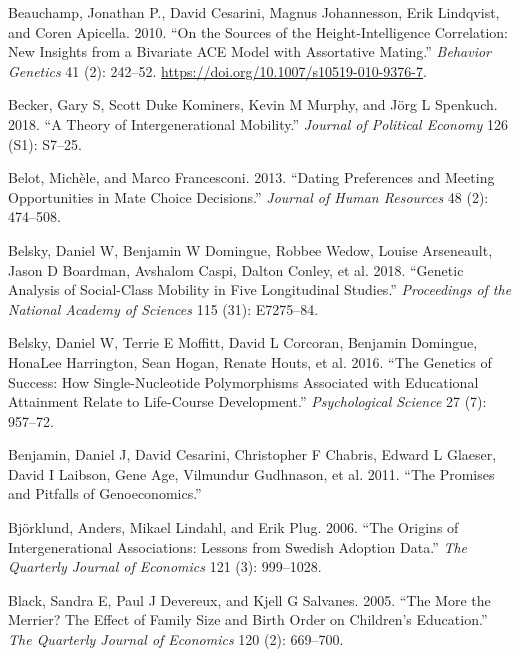 \documentclass[
  12pt,
]{article}
\newlength{\cslhangindent}
\newlength{\cslentryspacingunit} %
\newenvironment{CSLReferences}[2] %
 {%
  \setlength{\parindent}{0pt}
  \ifodd #1
  \let\oldpar\par
  \def\par{\hangindent=\cslhangindent\oldpar}
  \fi
  \setlength{\parskip}{#2\cslentryspacingunit}
 }%
 {}
\theoremstyle{definition}
\theoremstyle{definition}
\theoremstyle{definition}
\theoremstyle{definition}
\theoremstyle{remark}
\begin{document}
\begin{CSLReferences}{1}{0}
\leavevmode{}%
Beauchamp, Jonathan P., David Cesarini, Magnus Johannesson, Erik Lindqvist, and Coren Apicella. 2010. {``On the Sources of the Height-Intelligence Correlation: New Insights from a Bivariate {ACE} Model with Assortative Mating.''} \emph{Behavior Genetics} 41 (2): 242--52. \url{https://doi.org/10.1007/s10519-010-9376-7}.

\leavevmode{}%
Becker, Gary S, Scott Duke Kominers, Kevin M Murphy, and Jörg L Spenkuch. 2018. {``A Theory of Intergenerational Mobility.''} \emph{Journal of Political Economy} 126 (S1): S7--25.

\leavevmode{}%
Belot, Michèle, and Marco Francesconi. 2013. {``Dating Preferences and Meeting Opportunities in Mate Choice Decisions.''} \emph{Journal of Human Resources} 48 (2): 474--508.

\leavevmode{}%
Belsky, Daniel W, Benjamin W Domingue, Robbee Wedow, Louise Arseneault, Jason D Boardman, Avshalom Caspi, Dalton Conley, et al. 2018. {``Genetic Analysis of Social-Class Mobility in Five Longitudinal Studies.''} \emph{Proceedings of the National Academy of Sciences} 115 (31): E7275--84.

\leavevmode{}%
Belsky, Daniel W, Terrie E Moffitt, David L Corcoran, Benjamin Domingue, HonaLee Harrington, Sean Hogan, Renate Houts, et al. 2016. {``The Genetics of Success: How Single-Nucleotide Polymorphisms Associated with Educational Attainment Relate to Life-Course Development.''} \emph{Psychological Science} 27 (7): 957--72.

\leavevmode{}%
Benjamin, Daniel J, David Cesarini, Christopher F Chabris, Edward L Glaeser, David I Laibson, Gene Age, Vilmundur Gudhnason, et al. 2011. {``The Promises and Pitfalls of Genoeconomics.''}

\leavevmode{}%
Björklund, Anders, Mikael Lindahl, and Erik Plug. 2006. {``The Origins of Intergenerational Associations: Lessons from Swedish Adoption Data.''} \emph{The Quarterly Journal of Economics} 121 (3): 999--1028.

\leavevmode{}%
Black, Sandra E, Paul J Devereux, and Kjell G Salvanes. 2005. {``The More the Merrier? The Effect of Family Size and Birth Order on Children's Education.''} \emph{The Quarterly Journal of Economics} 120 (2): 669--700.


\end{CSLReferences}
\end{document}
